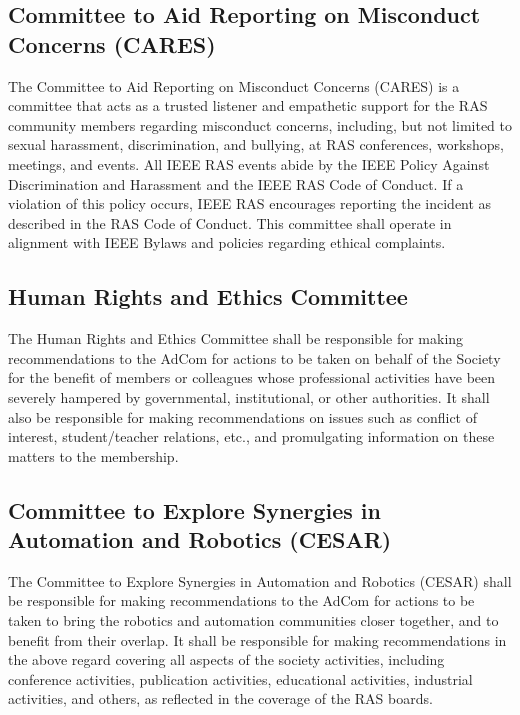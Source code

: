 \documentclass[10pt]{article}
\begin{document}
\subsection{Committee to Aid Reporting on Misconduct Concerns (CARES)}

The Committee to Aid Reporting on Misconduct Concerns (CARES) is a committee that acts as a trusted listener and empathetic support for the RAS community members regarding misconduct concerns, including, but not limited to sexual harassment, discrimination, and bullying, at RAS conferences, workshops, meetings, and events. All IEEE RAS events abide by the IEEE Policy Against Discrimination and Harassment and the IEEE RAS Code of Conduct. If a violation of this policy occurs, IEEE RAS encourages reporting the incident as described in the RAS Code of Conduct. This committee shall operate in alignment with IEEE Bylaws and policies regarding ethical complaints.

\subsection{Human Rights and Ethics Committee}

The Human Rights and Ethics Committee shall be responsible for making recommendations to the AdCom for actions to be taken on behalf of the Society for the benefit of members or colleagues whose professional activities have been severely hampered by governmental, institutional, or other authorities.    It shall also be responsible for making recommendations on issues such as conflict of interest, student/teacher relations, etc., and promulgating information on these matters to the membership. 

\subsection{Committee to Explore Synergies in Automation and Robotics (CESAR)}

The Committee to Explore Synergies in Automation and Robotics (CESAR) shall be responsible for making recommendations to the AdCom for actions to be taken to bring the robotics and automation communities closer together, and to benefit from their overlap. It shall be responsible for making recommendations in the above regard covering all aspects of the society activities, including conference activities, publication activities, educational activities, industrial activities, and others, as reflected in the coverage of the RAS boards. 
\end{document}
